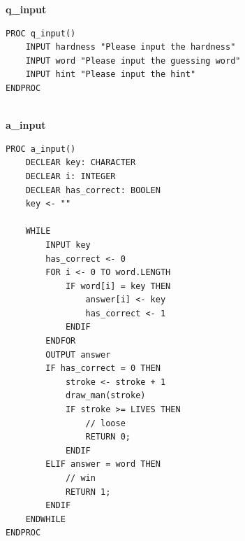 \documentclass{article}
\begin{document}
        \textbf{q\_input}
        \begin{lstlisting}
PROC q_input()
    INPUT hardness "Please input the hardness"
    INPUT word "Please input the guessing word"
    INPUT hint "Please input the hint"
ENDPROC 
        \end{lstlisting}
        \\

        \textbf{a\_input}
        \begin{lstlisting}
PROC a_input()
    DECLEAR key: CHARACTER
    DECLEAR i: INTEGER
    DECLEAR has_correct: BOOLEN
    key <- ""

    WHILE
        INPUT key
        has_correct <- 0
        FOR i <- 0 TO word.LENGTH
            IF word[i] = key THEN
                answer[i] <- key
                has_correct <- 1
            ENDIF
        ENDFOR
        OUTPUT answer
        IF has_correct = 0 THEN
            stroke <- stroke + 1
            draw_man(stroke)
            IF stroke >= LIVES THEN
                // loose
                RETURN 0;
            ENDIF
        ELIF answer = word THEN
            // win
            RETURN 1;
        ENDIF
    ENDWHILE
ENDPROC
        \end{lstlisting}
        \\
\end{document}
